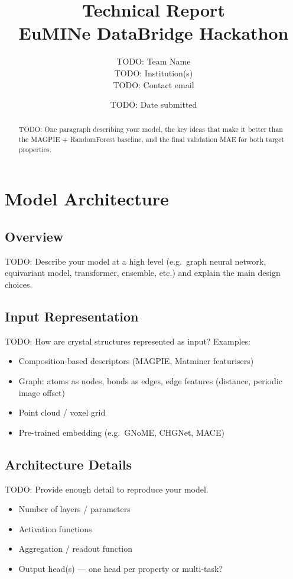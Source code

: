 \documentclass[10pt, a4paper]{article}
\title{%
  \textbf{Technical Report}\\[4pt]
  {\large EuMINe DataBridge Hackathon \hackathonyear}
}
\author{
  TODO: Team Name \\
  \small TODO: Institution(s) \\
  \small TODO: Contact email
}
\date{TODO: Date submitted}
\begin{document}
\maketitle
\thispagestyle{fancy}

\begin{abstract}
TODO: One paragraph describing your model, the key ideas that make it
better than the MAGPIE + RandomForest baseline, and the final validation
MAE for both target properties.
\end{abstract}

\tableofcontents
\vspace{1em}

\section{Model Architecture}

\subsection{Overview}
TODO: Describe your model at a high level (e.g.\ graph neural network,
equivariant model, transformer, ensemble, etc.) and explain the main
design choices.

\subsection{Input Representation}
TODO: How are crystal structures represented as input?
Examples:
\begin{itemize}
  \item Composition-based descriptors (MAGPIE, Matminer featurisers)
  \item Graph: atoms as nodes, bonds as edges, edge features (distance,
    periodic image offset)
  \item Point cloud / voxel grid
  \item Pre-trained embedding (e.g.\ GNoME, CHGNet, MACE)
\end{itemize}

\subsection{Architecture Details}
TODO: Provide enough detail to reproduce your model.
\begin{itemize}
  \item Number of layers / parameters
  \item Activation functions
  \item Aggregation / readout function
  \item Output head(s) — one head per property or multi-task?
\end{itemize}
\end{document}
